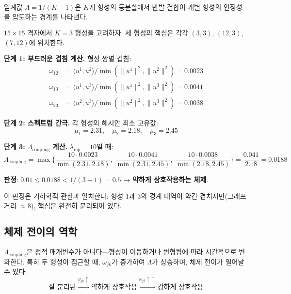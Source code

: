 임계값 $\Lambda = 1/(K-1)$은 $K$개 형성의 등분할에서 반발 결합이 개별 형성의 안정성을 압도하는 경계를 나타낸다.

\begin{example}
\label{ex:lambda-coupling-calc}
$15 \times 15$ 격자에서 $K = 3$ 형성을 고려하자. 세 형성의 핵심은 각각 $(3,3)$, $(12,3)$, $(7,12)$에 위치한다.

\textbf{단계 1: 부드러운 겹침 계산.} 형성 쌍별 겹침:
\begin{align}
    \omega_{12} &= \langle u^1, u^2 \rangle / \min(\|u^1\|^2, \|u^2\|^2) = 0.0023 \nonumber \\
    \omega_{13} &= \langle u^1, u^3 \rangle / \min(\|u^1\|^2, \|u^3\|^2) = 0.0041 \nonumber \\
    \omega_{23} &= \langle u^2, u^3 \rangle / \min(\|u^2\|^2, \|u^3\|^2) = 0.0038 \nonumber
\end{align}

\textbf{단계 2: 스펙트럼 간극.} 각 형성의 헤시안 최소 고유값:
\begin{equation}
    \mu_1 = 2.31, \quad \mu_2 = 2.18, \quad \mu_3 = 2.45 \nonumber
\end{equation}

\textbf{단계 3: $\Lambda_{\mathrm{coupling}}$ 계산.} $\lambda_{\mathrm{rep}} = 10$일 때:
\begin{equation}
    \Lambda_{\mathrm{coupling}} = \max\!\Big\{\frac{10 \cdot 0.0023}{\min(2.31, 2.18)},\; \frac{10 \cdot 0.0041}{\min(2.31, 2.45)},\; \frac{10 \cdot 0.0038}{\min(2.18, 2.45)}\Big\} = \frac{0.041}{2.18} = 0.0188 \nonumber
\end{equation}

\textbf{판정}: $0.01 \leq 0.0188 < 1/(3-1) = 0.5$ → \textbf{약하게 상호작용하는 체제}.

이 판정은 기하학적 관찰과 일치한다: 형성 1과 3의 경계 대역이 약간 겹치지만(그래프 거리 $\approx 8$), 핵심은 완전히 분리되어 있다.
\end{example}

\subsection{체제 전이의 역학}

$\Lambda_{\mathrm{coupling}}$은 정적 매개변수가 아니다---형성이 이동하거나 변형됨에 따라 시간적으로 변화한다. 특히 두 형성이 접근할 때, $\omega_{jk}$가 증가하여 $\Lambda$가 상승하며, 체제 전이가 일어날 수 있다:
\begin{equation}
    \text{잘 분리된} \xrightarrow{\omega_{jk} \uparrow} \text{약하게 상호작용} \xrightarrow{\omega_{jk} \uparrow\uparrow} \text{강하게 상호작용}
    \label{eq:regime-transition}
\end{equation}

